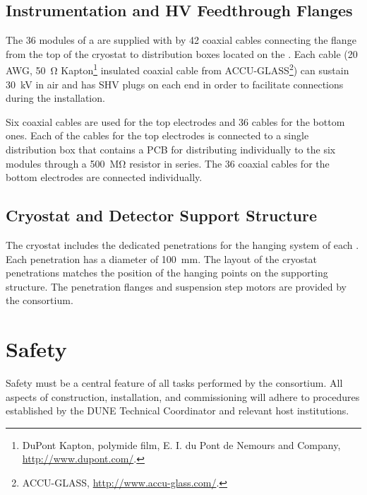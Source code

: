 \subsection{Instrumentation and HV Feedthrough Flanges}
\label{sec:dp-crp-intfc-FT}

The \num{36}  modules of a  are supplied with  by \num{42} coaxial cables 
connecting the \fdth flange from the top of the cryostat to distribution boxes located on the . Each cable (\num{20}\,AWG, \SI{50}{\ohm} Kapton\footnote{DuPont\texttrademark{} Kapton, polymide film,  E. I. du Pont de Nemours and Company,  \url{http://www.dupont.com/}.} insulated coaxial cable from ACCU-GLASS\footnote{ACCU-GLASS\texttrademark{}, \url{http://www.accu-glass.com/}.}) can sustain \SI{30}{kV} in air and has SHV plugs on each end in order to facilitate connections during the  installation.

Six coaxial cables are used for the top  electrodes and \num{36} cables for the bottom ones. Each of the cables for the top  electrodes is connected to a single distribution box that contains a PCB for distributing  individually to the six  modules through a \SI{500}{\mega\ohm} resistor in series. The \num{36} coaxial cables for the bottom   electrodes are connected individually.

\subsection{Cryostat and Detector Support Structure}
\label{sec:dp-crp-intfc-support}

The cryostat includes the dedicated penetrations for the hanging system of each . Each penetration has a diameter of \SI{100}{mm}. The layout of the cryostat penetrations   matches the position of the hanging points on the  supporting structure. The penetration flanges and  suspension step motors are provided by the  consortium.

\section{Safety}
\label{sec:dp-crp-safety}

Safety must be a central feature of all tasks performed by the  consortium.  All aspects of  construction, installation, and commissioning will adhere to procedures established by the DUNE Technical Coordinator and relevant host institutions. 

